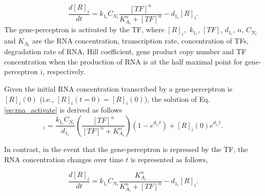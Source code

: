 \documentclass[twocolumn]{biophys-new}
\newcommand{\sm}[1]{\textcolor{brown}{#1}}
\begin{document}
{{\begin{equation}
    \dfrac{d[R]_i}{dt}= k_{1_i} C_{N_i} \dfrac{[TF]^n}{K_{A_i}^n + [TF]^n}- d_{1_i} [R]_i. \label{eq:rna_activate}
\end{equation}
The gene-perceptron is activated by the TF, where $[R]_i,$ $k_{1_i}$, $[TF]$, $d_{1_i}$, $n$, $C_{N_i}$ and $K_{A_i}$ are the RNA concentration, transcription rate, concentration of TFs, degradation rate of RNA, Hill coefficient, gene product copy number and TF concentration when the production of RNA is at the half maximal point for gene-perceptron  $i$, respectively.  

Given the initial RNA concentration transcribed by a gene-perceptron is $[R]_i(0)$ (i.e., $[R]_i(t=0)=[R]_i(0)$), the solution of Eq. \ref{eq:rna_activate} is  derived as follows
\begin{equation}
    [R]_i= \dfrac{k_{1_i} C_{N_i}}{d_{1_i}}\left(  \dfrac{[TF]^n}{[TF]^n+K_{A_i}^n} \right) (1-e^{d_{1_i}t}) + [R]_i(0) e^{d_{1_i}t}. \label{eq: sol_rna}
\end{equation} 


In contrast, in the event that the gene-perceptron is repressed by the TF, the RNA concentration changes over time $t$  is represented as follows, 

\vspace{-0.5em}
\begin{equation}
    \dfrac{d[R]_i}{dt}= k_{1_i} C_{N_i} \dfrac{K_{A_i}^n}{K_{A_i}^n + [TF]^n}- d_{1_i} [R]_i. \label{eq:rna_depress}
\end{equation}

}}
\end{document}
